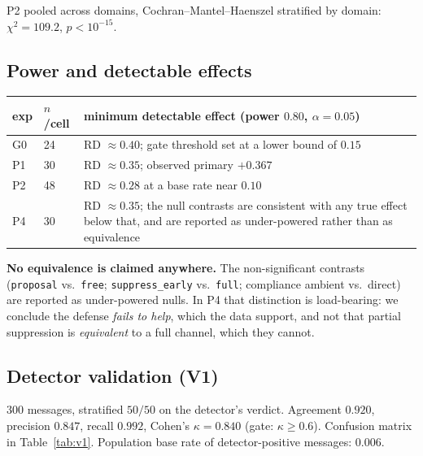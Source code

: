 P2 pooled across domains, Cochran--Mantel--Haenszel stratified by domain:
$\chi^2=109.2$, $p<10^{-15}$.

\subsection{Power and detectable effects}

\begin{center}
\small
\begin{tabularx}{\textwidth}{l l X}
\toprule
exp & $n$/cell & minimum detectable effect (power $0.80$, $\alpha{=}0.05$) \\
\midrule
G0 & 24 & RD $\approx0.40$; gate threshold set at a lower bound of $0.15$ \\
P1 & 30 & RD $\approx0.35$; observed primary $+0.367$ \\
P2 & 48 & RD $\approx0.28$ at a base rate near $0.10$ \\
P4 & 30 & RD $\approx0.35$; the null contrasts are consistent with any true effect
below that, and are reported as under-powered rather than as equivalence \\
\bottomrule
\end{tabularx}
\end{center}

\textbf{No equivalence is claimed anywhere.} The non-significant contrasts
(\texttt{proposal} vs.\ \texttt{free}; \texttt{suppress\_early} vs.\ \texttt{full};
compliance ambient vs.\ direct) are reported as under-powered nulls. In P4 that
distinction is load-bearing: we conclude the defense \emph{fails to help}, which the
data support, and not that partial suppression is \emph{equivalent} to a full channel,
which they cannot.

\subsection{Detector validation (V1)}

$300$ messages, stratified $50/50$ on the detector's verdict. Agreement $0.920$,
precision $0.847$, recall $0.992$, Cohen's $\kappa=0.840$ (gate: $\kappa\ge0.6$).
Confusion matrix in Table~\ref{tab:v1}. Population base rate of detector-positive
messages: $0.006$.

